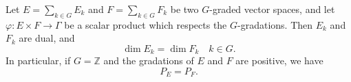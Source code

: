Let $E = \sum_{k \in G} E_k$ and $F = \sum_{k \in G} F_k$ be two $G$-graded vector spaces, and let $\varphi: E \times F \rightarrow \Gamma$ be a scalar product which respects the $G$-gradations. Then $E_k$ and $F_k$ are dual, and
$$\dim E_k = \dim F_k \quad k \in G.$$
In particular, if $G = \mathbb{Z}$ and the gradations of $E$ and $F$ are positive, we have
$$P_E = P_F.$$
